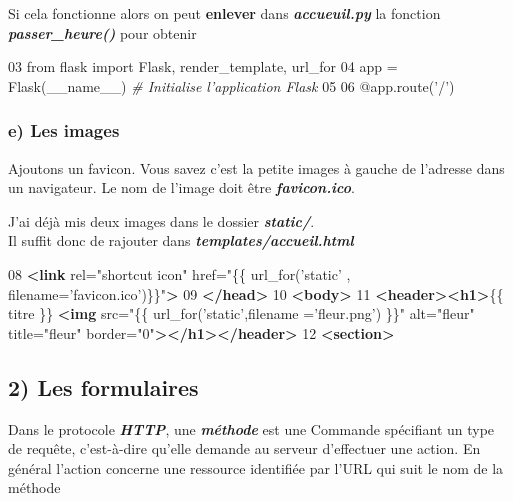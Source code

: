 \documentclass{article}
\newenvironment{Shaded}{}{}
\newcommand{\KeywordTok}[1]{\textcolor[rgb]{0.00,0.44,0.13}{\textbf{{#1}}}}
\newcommand{\DecValTok}[1]{\textcolor[rgb]{0.25,0.63,0.44}{{#1}}}
\newcommand{\CharTok}[1]{\textcolor[rgb]{0.25,0.44,0.63}{{#1}}}
\newcommand{\StringTok}[1]{\textcolor[rgb]{0.25,0.44,0.63}{{#1}}}
\newcommand{\CommentTok}[1]{\textcolor[rgb]{0.38,0.63,0.69}{\textit{{#1}}}}
\newcommand{\OtherTok}[1]{\textcolor[rgb]{0.00,0.44,0.13}{{#1}}}
\newcommand{\NormalTok}[1]{{#1}}
\begin{document}
Si cela fonctionne alors on peut \textbf{enlever} dans
\textbf{\emph{accueuil.py}} la fonction \textbf{\emph{passer\_heure()}}
pour obtenir

\begin{Shaded}
\begin{Highlighting}[]
\DecValTok{03} \CharTok{from} \NormalTok{flask }\CharTok{import} \NormalTok{Flask, render_template, url_for}
\DecValTok{04} \NormalTok{app = Flask(}\OtherTok{__name__}\NormalTok{) }\CommentTok{# Initialise l'application Flask}
\DecValTok{05} 
\DecValTok{06} \NormalTok{@app.route(}\StringTok{'/'}\NormalTok{)}
\end{Highlighting}
\end{Shaded}

    \subsubsection{e) Les images}\label{e-les-images}

Ajoutons un favicon. Vous savez c'est la petite images à gauche de
l'adresse dans un navigateur. Le nom de l'image doit être
\textbf{\emph{favicon.ico}}.

J'ai déjà mis deux images dans le dossier \textbf{\emph{static/}}.\\Il
suffit donc de rajouter dans \textbf{\emph{templates/accueil.html}}

\begin{Shaded}
\begin{Highlighting}[]
\NormalTok{08 }\KeywordTok{<link}\OtherTok{ rel=}\StringTok{"shortcut icon"}\OtherTok{ href=}\StringTok{"\{\{ url_for('static' , filename='favicon.ico')\}\}"}\KeywordTok{>}
\NormalTok{09 }\KeywordTok{</head>}
\NormalTok{10 }\KeywordTok{<body>}
\NormalTok{11 }\KeywordTok{<header><h1>}\NormalTok{\{\{ titre \}\} }\KeywordTok{<img}\OtherTok{ src=}\StringTok{"\{\{ url_for('static',filename ='fleur.png') \}\}"}\OtherTok{ alt=}\StringTok{"fleur"}\OtherTok{ title=}\StringTok{"fleur"}\OtherTok{ border=}\StringTok{"0"}\KeywordTok{></h1></header>}
\NormalTok{12 }\KeywordTok{<section>}
\end{Highlighting}
\end{Shaded}

    \subsection{2) Les formulaires}\label{les-formulaires}

Dans le protocole \textbf{\emph{HTTP}}, une \textbf{\emph{méthode}} est
une Commande spécifiant un type de requête, c'est-à-dire qu'elle demande
au serveur d'effectuer une action. En général l'action concerne une
ressource identifiée par l'URL qui suit le nom de la méthode
\end{document}
